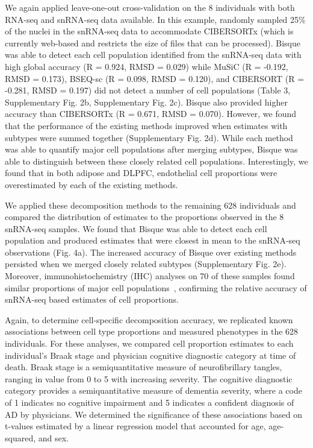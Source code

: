We again applied leave-one-out cross-validation on the 8 individuals with both RNA-seq and snRNA-seq data available. In this example, randomly sampled 25\% of the nuclei in the snRNA-seq data to accommodate CIBERSORTx (which is currently web-based and restricts the size of files that can be processed). Bisque was able to detect each cell population identified from the snRNA-seq data with high global accuracy (R = 0.924, RMSD = 0.029) while MuSiC (R = -0.192, RMSD = 0.173), BSEQ-sc (R = 0.098, RMSD = 0.120), and CIBERSORT (R = -0.281, RMSD = 0.197) did not detect a number of cell populations (Table 3, Supplementary Fig. 2b, Supplementary Fig. 2c). Bisque also provided higher accuracy than CIBERSORTx (R = 0.671, RMSD = 0.070). However, we found that the performance of the existing methods improved when estimates with subtypes were summed together (Supplementary Fig. 2d). While each method was able to quantify major cell populations after merging subtypes, Bisque was able to distinguish between these closely related cell populations. Interestingly, we found that in both adipose and DLPFC, endothelial cell proportions were overestimated by each of the existing methods.
	 	 	
We applied these decomposition methods to the remaining 628 individuals and compared the distribution of estimates to the proportions observed in the 8 snRNA-seq samples. We found that Bisque was able to detect each cell population and produced estimates that were closest in mean to the snRNA-seq observations (Fig. 4a). The increased accuracy of Bisque over existing methods persisted when we merged closely related subtypes (Supplementary Fig. 2e). Moreover, immunohistochemistry (IHC) analyses on 70 of these samples found similar proportions of major cell populations~\cite{Patrick_undated-vv}, confirming the relative accuracy of snRNA-seq based estimates of cell proportions. 

Again, to determine cell-specific decomposition accuracy, we replicated known associations between cell type proportions and measured phenotypes in the 628 individuals. For these analyses, we compared cell proportion estimates to each individual’s Braak stage and physician cognitive diagnostic category at time of death. Braak stage is a semiquantitative measure of neurofibrillary tangles, ranging in value from 0 to 5 with increasing severity. The cognitive diagnostic category provides a semiquantitative measure of dementia severity, where a code of 1 indicates no cognitive impairment and 5 indicates a confident diagnosis of AD by physicians.  We determined the significance of these associations based on t-values estimated by a linear regression model that accounted for age, age-squared, and sex. 

